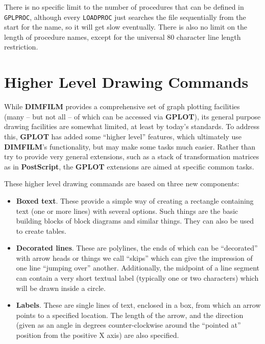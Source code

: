 \documentclass[a4paper,twoside,11pt]{article}
\newcommand{\newpara}{\par\vspace{4mm}\noindent}
\begin{document}
\newpara
There is no specific limit to the number of procedures that can be defined in \texttt{GPLPROC},
although every \texttt{LOADPROC} just searches the file sequentially from the start for the name,
so it will get slow eventually. There is also no limit on the length of procedure names,
except for the universal 80 character line length restriction.


\section{Higher Level Drawing Commands}
\newpara
While \textbf{DIMFILM} provides a comprehensive set of graph plotting facilities (many -- but not all -- of which can
be accessed via \textbf{GPLOT}), its general purpose drawing facilities are somewhat limited, at least by today's
standards. To address this, \textbf{GPLOT} has added some ``higher level'' features, which ultimately use \textbf{DIMFILM}'s
functionality, but may make some tasks much easier. Rather than try to provide very general extensions, such as a stack
of transformation matrices as in \textbf{PostScript}, the \textbf{GPLOT} extensions are aimed at specific common tasks.

\newpara
These higher level drawing commands are based on three new components:
\begin{itemize}
\item \textbf{Boxed text}. These provide a simple way of creating a rectangle containing text (one or more
  lines) with several options. Such things are the basic building blocks of block diagrams and similar things.
  They can also be used to create tables.
\item \textbf{Decorated lines}. These are polylines, the ends of which can be ``decorated'' with arrow heads or things
  we call ``skips'' which can give the impression of one line ``jumping over'' another. Additionally, the
  midpoint of a line segment can contain a very short textual label (typically one or two characters) which
  will be drawn inside a circle.
\item \textbf{Labels}. These are single lines of text, enclosed in a box, from which an arrow points to a specified
  location. The length of the arrow, and the direction (given as an angle in degrees counter-clockwise
  around the ``pointed at'' position from the positive X axis)
  are also specified.
\end{itemize}
\end{document}
